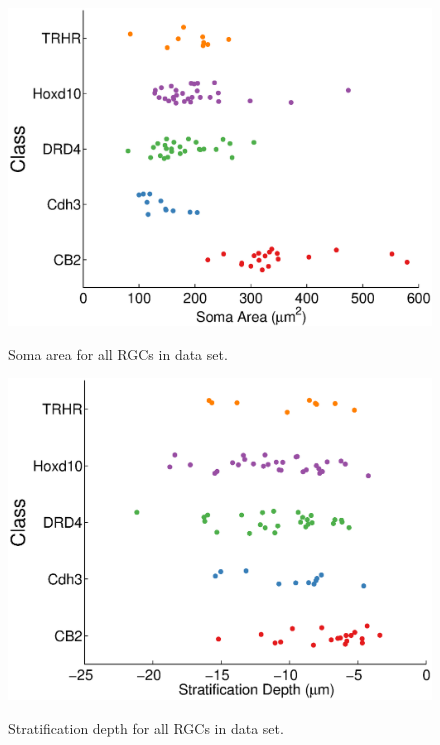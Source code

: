 \documentclass{article}
\begin{document}
\begin{figure}
  \centering
  {\includegraphics[scale=0.75]{Figures/SupFig3/plotFeatures-somaArea.eps}}
  \caption{Soma area for all RGCs in data set.}
\end{figure}


\begin{figure}
  \centering
  {\includegraphics[scale=0.75]{Figures/SupFig3/plotFeatures-stratificationDepth.eps}}
  \caption{Stratification depth for all RGCs in data set.}
\end{figure}

\clearpage
\end{document}
